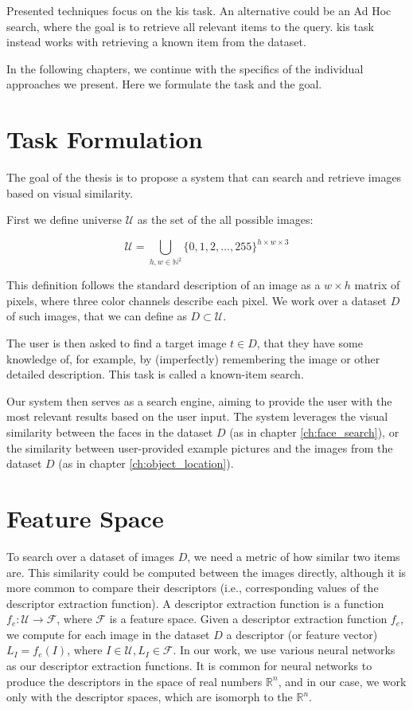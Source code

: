 Presented techniques focus on the \acrlong{kis} task. An alternative could be an Ad Hoc search, where the goal is to retrieve all relevant items to the query. \acrlong{kis} task instead works with retrieving a known item from the dataset.

In the following chapters, we continue with the specifics of the individual approaches we present. Here we formulate the task and the goal.


\section{Task Formulation}
\label{s:task_formulation_preliminaries}

The goal of the thesis is to propose a system that can search and retrieve images based on visual similarity.  

First we define universe $\mathcal{U}$ as the set of the all possible images:

$$
    \mathcal{U} = \bigcup_{h,w \in \mathbb{N}^2} \{0, 1, 2, \ldots, 255 \}^{h \times w \times 3}
$$

This definition follows the standard description of an image as a $w \times h$ matrix of pixels, where three color channels describe each pixel. We work over a dataset $D$ of such images, that we can define as $D \subset \mathcal{U}$.

The user is then asked to find a target image $t \in D$, that they have some knowledge of, for example, by (imperfectly) remembering the image or other detailed description. This task is called a known-item search.

Our system then serves as a search engine, aiming to provide the user with the most relevant results based on the user input. The system leverages the visual similarity between the faces in the dataset $D$ (as in chapter \ref{ch:face_search}), or the similarity between user-provided example pictures and the images from the dataset $D$ (as in chapter \ref{ch:object_location}).

\section{Feature Space}

To search over a dataset of images $D$, we need a metric of how similar two items are. This similarity could be computed between the images directly, although it is more common to compare their descriptors (i.e., corresponding values of the descriptor extraction function). A descriptor extraction function is a function $f_e: \mathcal{U} \rightarrow \mathcal{F}$, where $\mathcal{F}$ is a feature space. Given a descriptor extraction function $f_e$, we compute for each image in the dataset $D$ a descriptor (or feature vector) $L_I = f_e(I)$, where $I \in \mathcal{U}, L_I \in \mathcal{F}$. In our work, we use various neural networks as our descriptor extraction functions. It is common for neural networks to produce the descriptors in the space of real numbers $\mathbb{R}^n$, and in our case, we work only with the descriptor spaces, which are isomorph to the $\mathbb{R}^n$.

